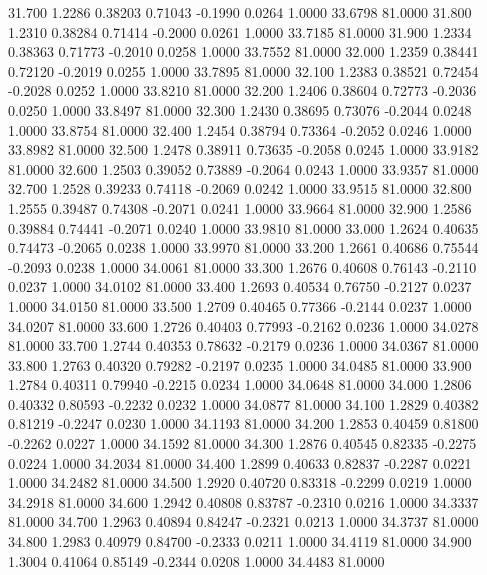   31.700   1.2286   0.38203   0.71043  -0.1990   0.0264   1.0000  33.6798  81.0000
  31.800   1.2310   0.38284   0.71414  -0.2000   0.0261   1.0000  33.7185  81.0000
  31.900   1.2334   0.38363   0.71773  -0.2010   0.0258   1.0000  33.7552  81.0000
  32.000   1.2359   0.38441   0.72120  -0.2019   0.0255   1.0000  33.7895  81.0000
  32.100   1.2383   0.38521   0.72454  -0.2028   0.0252   1.0000  33.8210  81.0000
  32.200   1.2406   0.38604   0.72773  -0.2036   0.0250   1.0000  33.8497  81.0000
  32.300   1.2430   0.38695   0.73076  -0.2044   0.0248   1.0000  33.8754  81.0000
  32.400   1.2454   0.38794   0.73364  -0.2052   0.0246   1.0000  33.8982  81.0000
  32.500   1.2478   0.38911   0.73635  -0.2058   0.0245   1.0000  33.9182  81.0000
  32.600   1.2503   0.39052   0.73889  -0.2064   0.0243   1.0000  33.9357  81.0000
  32.700   1.2528   0.39233   0.74118  -0.2069   0.0242   1.0000  33.9515  81.0000
  32.800   1.2555   0.39487   0.74308  -0.2071   0.0241   1.0000  33.9664  81.0000
  32.900   1.2586   0.39884   0.74441  -0.2071   0.0240   1.0000  33.9810  81.0000
  33.000   1.2624   0.40635   0.74473  -0.2065   0.0238   1.0000  33.9970  81.0000
  33.200   1.2661   0.40686   0.75544  -0.2093   0.0238   1.0000  34.0061  81.0000
  33.300   1.2676   0.40608   0.76143  -0.2110   0.0237   1.0000  34.0102  81.0000
  33.400   1.2693   0.40534   0.76750  -0.2127   0.0237   1.0000  34.0150  81.0000
  33.500   1.2709   0.40465   0.77366  -0.2144   0.0237   1.0000  34.0207  81.0000
  33.600   1.2726   0.40403   0.77993  -0.2162   0.0236   1.0000  34.0278  81.0000
  33.700   1.2744   0.40353   0.78632  -0.2179   0.0236   1.0000  34.0367  81.0000
  33.800   1.2763   0.40320   0.79282  -0.2197   0.0235   1.0000  34.0485  81.0000
  33.900   1.2784   0.40311   0.79940  -0.2215   0.0234   1.0000  34.0648  81.0000
  34.000   1.2806   0.40332   0.80593  -0.2232   0.0232   1.0000  34.0877  81.0000
  34.100   1.2829   0.40382   0.81219  -0.2247   0.0230   1.0000  34.1193  81.0000
  34.200   1.2853   0.40459   0.81800  -0.2262   0.0227   1.0000  34.1592  81.0000
  34.300   1.2876   0.40545   0.82335  -0.2275   0.0224   1.0000  34.2034  81.0000
  34.400   1.2899   0.40633   0.82837  -0.2287   0.0221   1.0000  34.2482  81.0000
  34.500   1.2920   0.40720   0.83318  -0.2299   0.0219   1.0000  34.2918  81.0000
  34.600   1.2942   0.40808   0.83787  -0.2310   0.0216   1.0000  34.3337  81.0000
  34.700   1.2963   0.40894   0.84247  -0.2321   0.0213   1.0000  34.3737  81.0000
  34.800   1.2983   0.40979   0.84700  -0.2333   0.0211   1.0000  34.4119  81.0000
  34.900   1.3004   0.41064   0.85149  -0.2344   0.0208   1.0000  34.4483  81.0000
